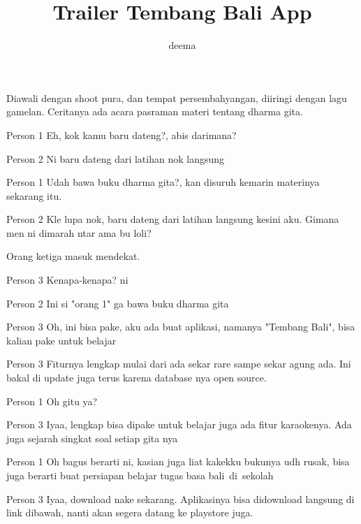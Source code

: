 \documentclass{screenplay}[2012/06/30]
\title{Trailer Tembang Bali App}
\author{deema}
\begin{document}
\maketitle

Diawali dengan shoot pura, dan tempat persembahyangan, diiringi dengan lagu gamelan. Ceritanya ada acara pasraman materi tentang dharma gita.
\begin{dialogue}{Person 1}
    Eh, kok kamu baru dateng?, abis darimana?
\end{dialogue}
\begin{dialogue}{Person 2}
    Ni baru dateng dari latihan nok langsung
\end{dialogue}
\begin{dialogue}{Person 1}
    Udah bawa buku dharma gita?, kan disuruh kemarin materinya sekarang itu.
\end{dialogue}
\begin{dialogue}{Person 2}
    Kle lupa nok, baru dateng dari latihan langsung kesini aku. Gimana men ni dimarah ntar ama bu loli?
\end{dialogue}
Orang ketiga masuk mendekat.
\begin{dialogue}{Person 3}
    Kenapa-kenapa? ni
\end{dialogue}
\begin{dialogue}{Person 2}
    Ini si "orang 1" ga bawa buku dharma gita
\end{dialogue}
\begin{dialogue}{Person 3}
    Oh, ini bisa pake, aku ada buat aplikasi, namanya "Tembang Bali", bisa kalian pake untuk belajar
\end{dialogue}
\begin{dialogue}{Person 3}
    Fiturnya lengkap mulai dari ada sekar rare sampe sekar agung ada. Ini bakal di update juga terus karena database nya open source.
\end{dialogue}
\begin{dialogue}{Person 1}
    Oh gitu ya?
\end{dialogue}
\begin{dialogue}{Person 3}
    Iyaa, lengkap bisa dipake untuk belajar juga ada fitur karaokenya. Ada juga sejarah singkat soal setiap gita nya
\end{dialogue}
\begin{dialogue}{Person 1}
    Oh bagus berarti ni, kasian juga liat kakekku bukunya udh rusak, bisa juga berarti buat persiapan belajar tugas basa bali di sekolah
\end{dialogue}
\begin{dialogue}{Person 3}
   Iyaa, download nake sekarang. Aplikasinya bisa didownload langsung di link dibawah, nanti akan segera datang ke playstore juga.
\end{dialogue}
\end{document}
